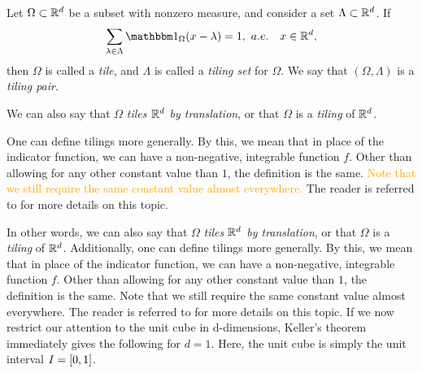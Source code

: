\documentclass[../thesis.tex]{subfiles}
\begin{document}
\begin{definition}\label{def:tiling}
    Let $\Omega \subset \mathbb{R}^d$ be a subset with nonzero measure, and consider a  set $\Lambda \subset \mathbb{R}^d$. If
    \begin{equation}\label{eq:tiling_set}
        \sum_{\lambda \in \Lambda} \indicator{\Omega}{x-\lambda} = 1, \text{\space} a.e. \quad x \in \R^d,
    \end{equation}
    then $\Omega$ is called a \emph{tile}, and $\Lambda$ is called a \emph{tiling set} for $\Omega$. We say that $(\Omega, \Lambda)$ is a \emph{tiling pair}.
\end{definition}
\begin{remark}
    We can also say that $\Omega$ \emph{tiles $\mathbb{R}^d$ by translation}, or that $\Omega$ is a \emph{tiling} of $\mathbb{R}^d$. 
\end{remark}
\begin{remark}
    One can define tilings more generally. By this, we mean that in place of the indicator function, we can have a non-negative, integrable function $f$. Other than allowing for any other constant value than $1$, the definition is the same. \textcolor{orange}{Note that we still require the same constant value almost everywhere.} The reader is referred to \cite{kolountzakisTilingsTranslation2010} for more details on this topic. 
\end{remark}



In other words, we can also say that $\Omega$ \emph{tiles $\mathbb{R}^d$ by translation}, or that $\Omega$ is a \emph{tiling} of $\mathbb{R}^d$. Additionally, one can define tilings more generally. By this, we mean that in place of the indicator function, we can have a non-negative, integrable function $f$. Other than allowing for any other constant value than $1$, the definition is the same. Note that we still require the same constant value almost everywhere. The reader is referred to \cite{kolountzakisTilingsTranslation2010} for more details on this topic.
 If we now restrict our attention to the unit cube in d-dimensions, Keller's theorem immediately gives the following for $d=1$. Here, the unit cube is simply the unit interval $I = [0,1]$. %
\end{document}
